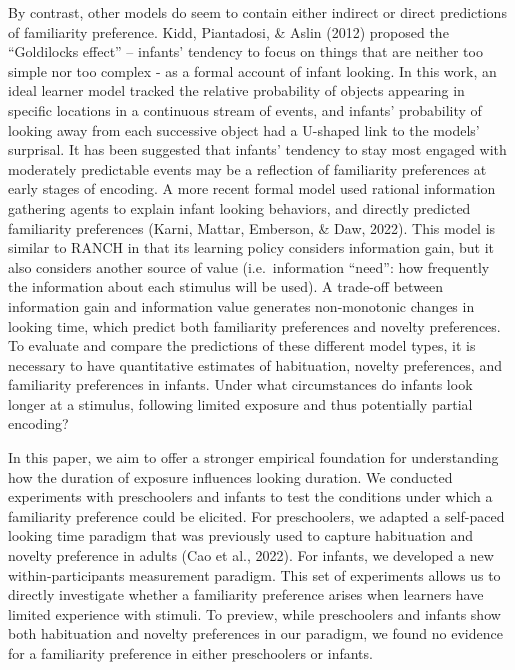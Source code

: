 \documentclass[10pt, letterpaper]{article}
\begin{document}
By contrast, other models do seem to contain either indirect or direct
predictions of familiarity preference. Kidd, Piantadosi, \& Aslin (2012)
proposed the ``Goldilocks effect'' -- infants' tendency to focus on
things that are neither too simple nor too complex - as a formal account
of infant looking. In this work, an ideal learner model tracked the
relative probability of objects appearing in specific locations in a
continuous stream of events, and infants' probability of looking away
from each successive object had a U-shaped link to the models'
surprisal. It has been suggested that infants' tendency to stay most
engaged with moderately predictable events may be a reflection of
familiarity preferences at early stages of encoding. A more recent
formal model used rational information gathering agents to explain
infant looking behaviors, and directly predicted familiarity preferences
(Karni, Mattar, Emberson, \& Daw, 2022). This model is similar to RANCH
in that its learning policy considers information gain, but it also
considers another source of value (i.e.~information ``need'': how
frequently the information about each stimulus will be used). A
trade-off between information gain and information value generates
non-monotonic changes in looking time, which predict both familiarity
preferences and novelty preferences. To evaluate and compare the
predictions of these different model types, it is necessary to have
quantitative estimates of habituation, novelty preferences, and
familiarity preferences in infants. Under what circumstances do infants
look longer at a stimulus, following limited exposure and thus
potentially partial encoding?

In this paper, we aim to offer a stronger empirical foundation for
understanding how the duration of exposure influences looking duration.
We conducted experiments with preschoolers and infants to test the
conditions under which a familiarity preference could be elicited. For
preschoolers, we adapted a self-paced looking time paradigm that was
previously used to capture habituation and novelty preference in adults
(Cao et al., 2022). For infants, we developed a new within-participants
measurement paradigm. This set of experiments allows us to directly
investigate whether a familiarity preference arises when learners have
limited experience with stimuli. To preview, while preschoolers and
infants show both habituation and novelty preferences in our paradigm,
we found no evidence for a familiarity preference in either preschoolers
or infants.
\end{document}
